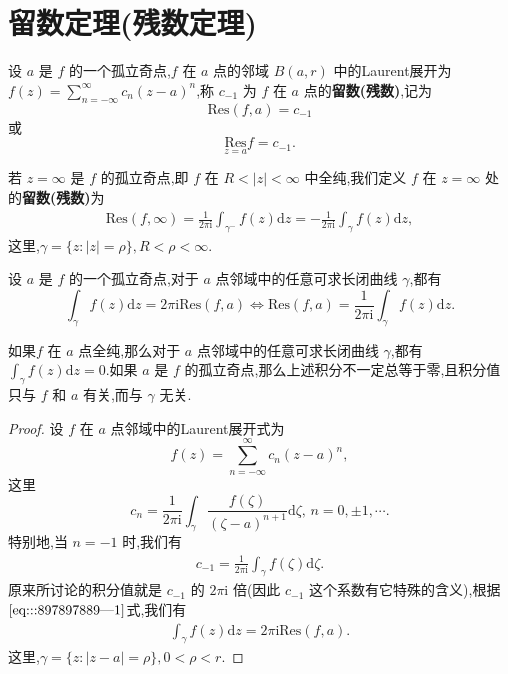 \documentclass[../../main.tex]{subfiles}%
\begin{document}
\section{留数定理(残数定理)}

\begin{definition}
设 \( a \) 是 \( f \) 的一个孤立奇点,\( f \) 在 \( a \) 点的邻域 \( B(a,r) \) 中的Laurent展开为 \( f(z) = \sum_{n = -\infty}^{\infty} c_n (z - a)^n \),称 \( c_{-1} \) 为 \( f \) 在 \( a \) 点的\textbf{留数(残数)},记为
\[
\mathrm{Res}(f,a) = c_{-1}
\]
或
\[
\underset{z = a}{\mathrm{Res}} f = c_{-1}.
\]

若 \( z = \infty \) 是 \( f \) 的孤立奇点,即 \( f \) 在 \( R < |z| < \infty \) 中全纯,我们定义 \( f \) 在 \( z = \infty \) 处的\textbf{留数(残数)}为
\begin{align}
\mathrm{Res}(f,\infty) =\frac{1}{2\pi \mathrm{i}} \int_{\gamma^-} f(z) \mathrm{d}z= -\frac{1}{2\pi \mathrm{i}} \int_{\gamma} f(z) \mathrm{d}z, \label{eq:::897897889---3}
\end{align}
这里,\( \gamma = \{ z: |z| = \rho \}, R < \rho < \infty \).
\end{definition}

\begin{proposition}\label{proposition:积分与留数的关系}
设 \( a \) 是 \( f \) 的一个孤立奇点,对于 \( a \) 点邻域中的任意可求长闭曲线 \( \gamma \),都有
$$
\int_{\gamma} f(z) \mathrm{d}z = 2\pi \mathrm{i} \mathrm{Res}(f,a)\iff \mathrm{Res}\left( f,a \right) =\frac{1}{2\pi \mathrm{i}}\int_{\gamma}{f(z)\mathrm{d}z}.
$$
\end{proposition}
\begin{remark}
如果\( f \) 在 \( a \) 点全纯,那么对于 \( a \) 点邻域中的任意可求长闭曲线 \( \gamma \),都有 \( \int_{\gamma} f(z) \mathrm{d}z = 0 \).如果 \( a \) 是 \( f \) 的孤立奇点,那么上述积分不一定总等于零,且积分值只与 \( f \) 和 \( a \) 有关,而与 \( \gamma \) 无关.
\end{remark}
\begin{proof}
设 \( f \) 在 \( a \) 点邻域中的Laurent展开式为
\[
f(z) = \sum_{n = -\infty}^{\infty} c_n (z - a)^n,
\]
这里
\[
c_n = \frac{1}{2\pi \mathrm{i}} \int_{\gamma} \frac{f(\zeta)}{(\zeta - a)^{n + 1}} \mathrm{d}\zeta, \, n = 0, \pm 1, \cdots.
\]
特别地,当 \( n = -1 \) 时,我们有
\begin{align}
c_{-1} = \frac{1}{2\pi \mathrm{i}} \int_{\gamma} f(\zeta) \mathrm{d}\zeta. \label{eq:::897897889---1}
\end{align}
原来所讨论的积分值就是 \( c_{-1} \) 的 \( 2\pi \mathrm{i} \) 倍(因此 \( c_{-1} \) 这个系数有它特殊的含义),根据\(\eqref{eq:::897897889---1}\)式,我们有
\begin{align}
\int_{\gamma} f(z) \mathrm{d}z = 2\pi \mathrm{i} \mathrm{Res}(f,a). \label{eq:::897897889---2}
\end{align}
这里,\( \gamma = \{ z: |z - a| = \rho \}, 0 < \rho < r \).
\end{proof}
\end{document}
